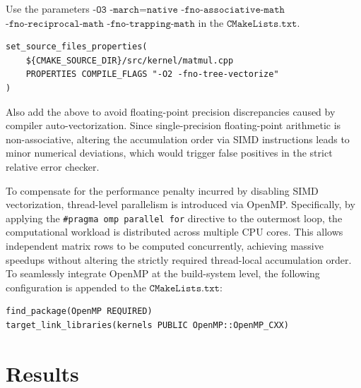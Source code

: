 \documentclass[11pt]{article}
\begin{document}
Use the parameters \(\texttt{-O3 -march=native -fno-associative-math}\)\\  \(\texttt{-fno-reciprocal-math -fno-trapping-math}\) in the \(\texttt{CMakeLists.txt}\). 

\begin{verbatim}
set_source_files_properties(
    ${CMAKE_SOURCE_DIR}/src/kernel/matmul.cpp
    PROPERTIES COMPILE_FLAGS "-O2 -fno-tree-vectorize"
)
\end{verbatim}

\noindent Also add the above to avoid floating-point precision discrepancies caused by compiler auto-vectorization. Since single-precision floating-point arithmetic is non-associative, altering the accumulation order via SIMD instructions leads to minor numerical deviations, which would trigger false positives in the strict relative error checker.

\vspace{0.3em}

\noindent To compensate for the performance penalty incurred by disabling SIMD vectorization, thread-level parallelism is introduced via OpenMP. Specifically, by applying the \texttt{\#pragma omp parallel for} directive to the outermost loop, the computational workload is distributed across multiple CPU cores. This allows independent matrix rows to be computed concurrently, achieving massive speedups without altering the strictly required thread-local accumulation order. To seamlessly integrate OpenMP at the build-system level, the following configuration is appended to the \(\texttt{CMakeLists.txt}\):

\begin{verbatim}
find_package(OpenMP REQUIRED)
target_link_libraries(kernels PUBLIC OpenMP::OpenMP_CXX)
\end{verbatim}

\section{Results}
\end{document}
